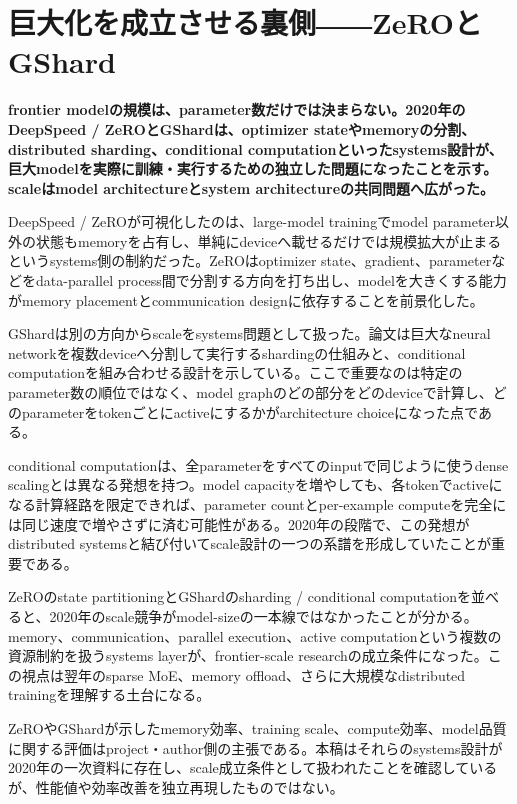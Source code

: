 \section{巨大化を成立させる裏側――ZeROとGShard}
\label{pkg:systems-scale}
\noindent\textbf{frontier modelの規模は、parameter数だけでは決まらない。2020年のDeepSpeed / ZeROとGShardは、optimizer stateやmemoryの分割、distributed sharding、conditional computationといったsystems設計が、巨大modelを実際に訓練・実行するための独立した問題になったことを示す。scaleはmodel architectureとsystem architectureの共同問題へ広がった。}\autocite{src-56ccf2fa5ce7,src-f1047e7f654c}

DeepSpeed / ZeROが可視化したのは、large-model trainingでmodel parameter以外の状態もmemoryを占有し、単純にdeviceへ載せるだけでは規模拡大が止まるというsystems側の制約だった。ZeROはoptimizer state、gradient、parameterなどをdata-parallel process間で分割する方向を打ち出し、modelを大きくする能力がmemory placementとcommunication designに依存することを前景化した。\autocite{src-f1047e7f654c}


GShardは別の方向からscaleをsystems問題として扱った。論文は巨大なneural networkを複数deviceへ分割して実行するshardingの仕組みと、conditional computationを組み合わせる設計を示している。ここで重要なのは特定のparameter数の順位ではなく、model graphのどの部分をどのdeviceで計算し、どのparameterをtokenごとにactiveにするかがarchitecture choiceになった点である。\autocite{src-56ccf2fa5ce7}


conditional computationは、全parameterをすべてのinputで同じように使うdense scalingとは異なる発想を持つ。model capacityを増やしても、各tokenでactiveになる計算経路を限定できれば、parameter countとper-example computeを完全には同じ速度で増やさずに済む可能性がある。2020年の段階で、この発想がdistributed systemsと結び付いてscale設計の一つの系譜を形成していたことが重要である。\autocite{src-56ccf2fa5ce7}


ZeROのstate partitioningとGShardのsharding / conditional computationを並べると、2020年のscale競争がmodel-sizeの一本線ではなかったことが分かる。memory、communication、parallel execution、active computationという複数の資源制約を扱うsystems layerが、frontier-scale researchの成立条件になった。この視点は翌年のsparse MoE、memory offload、さらに大規模なdistributed trainingを理解する土台になる。\autocite{src-56ccf2fa5ce7,src-f1047e7f654c}


\begin{claimboundary}
ZeROやGShardが示したmemory効率、training scale、compute効率、model品質に関する評価はproject・author側の主張である。本稿はそれらのsystems設計が2020年の一次資料に存在し、scale成立条件として扱われたことを確認しているが、性能値や効率改善を独立再現したものではない。\autocite{src-56ccf2fa5ce7,src-f1047e7f654c}
\end{claimboundary}

